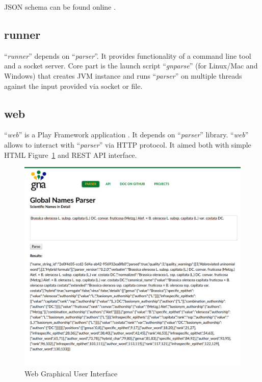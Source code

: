 \documentclass{bmcart}
\begin{document}
JSON schema can be found online \cite{gnparser-json}.

\subsection*{runner}

``\textit{runner}'' depends on ``\textit{parser}''. It provides functionality
of a command line tool and a socket server. Core part is the launch script
``\textit{gnparse}'' (for Linux/Mac and Windows) that creates JVM
instance and runs ``\textit{parser}'' on multiple threads against the input
provided via socket or file.

\subsection*{web}

``\textit{web}'' is a Play Framework application \cite{wampler2011scala}. It
depends on ``\textit{parser}'' library. ``\textit{web}'' allows to interact
with ``\textit{parser}'' via HTTP protocol. It aimed both with simple HTML
Figure~\ref{figure:webgui} and REST API interface.

\begin{figure}[htbp]
  \begin{center}
    \caption{
      Web Graphical User Interface
    }\label{figure:webgui}
    \vspace{5mm}

    \includegraphics[scale=0.175]{images/web_gui.png}
  \end{center}
\end{figure}
\end{document}
